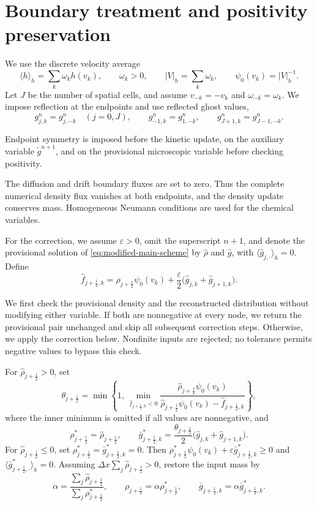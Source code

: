\documentclass[11pt,twoside]{article}
\numberwithin{equation}{section}
\theoremstyle{plain}
\theoremstyle{nonumberplain}
\newenvironment{resultrevision}{\par\begingroup\color{red}}{\par\endgroup}
\begin{document}
\section{Boundary treatment and positivity preservation}
\label{sec:limiter}
We use the discrete velocity average
\[
\langle h\rangle_h=\sum_{k}\omega_k h(v_k),
\qquad \omega_k>0,\qquad
|V|_h=\sum_{k}\omega_k,\qquad
\psi_0(v_k)=|V|_h^{-1}.
\]
Let $J$ be the number of spatial cells, and assume
$v_{-k}=-v_k$ and $\omega_{-k}=\omega_k$.
We impose reflection at the endpoints and use reflected ghost values,
\[
g_{j,k}^n=g_{j,-k}^n\quad(j=0,J),\qquad
g_{-1,k}^n=g_{1,-k}^n,\qquad
g_{J+1,k}^n=g_{J-1,-k}^n.
\]
\begin{resultrevision}
Endpoint symmetry is imposed before the kinetic update, on the auxiliary variable $\widetilde g^{n+1}$, and on the provisional microscopic variable before checking positivity.
\end{resultrevision}
The diffusion and drift boundary fluxes are set to zero.
Thus the complete numerical density flux vanishes at both endpoints,
and the density update conserves mass.
Homogeneous Neumann conditions are used for the chemical variables.

For the correction, we assume $\varepsilon>0$, omit the superscript $n+1$,
and denote the provisional solution of
\eqref{eq:modified-main-scheme} by $\widehat\rho$ and $\widehat g$,
with $\langle\widehat g_{j,\cdot}\rangle_h=0$.
Define
\[
\widehat f_{j+\frac12,k}
=\widehat\rho_{j+\frac12}\psi_0(v_k)
+\frac{\varepsilon}{2}
 \bigl(\widehat g_{j,k}+\widehat g_{j+1,k}\bigr).
\]
\begin{resultrevision}
We first check the provisional density and the reconstructed distribution without modifying either variable. If both are nonnegative at every node, we return the provisional pair unchanged and skip all subsequent correction steps. Otherwise, we apply the correction below. Nonfinite inputs are rejected; no tolerance permits negative values to bypass this check.
\end{resultrevision}

For $\widehat\rho_{j+\frac12}>0$, set
\[
\theta_{j+\frac12}
=\min\left\{1,\,
\min_{\widehat f_{j+\frac12,k}<0}
\frac{\widehat\rho_{j+\frac12}\psi_0(v_k)}
{\widehat\rho_{j+\frac12}\psi_0(v_k)-\widehat f_{j+\frac12,k}}
\right\},
\]
where the inner minimum is omitted if all values are nonnegative, and
\[
\rho_{j+\frac12}^{*}=\widehat\rho_{j+\frac12},
\qquad
\bar g_{j+\frac12,k}^{*}
=\frac{\theta_{j+\frac12}}{2}
 \bigl(\widehat g_{j,k}+\widehat g_{j+1,k}\bigr).
\]
For $\widehat\rho_{j+\frac12}\le0$, set
$\rho_{j+\frac12}^{*}=\bar g_{j+\frac12,k}^{*}=0$.
Then $\rho_{j+\frac12}^{*}\psi_0(v_k)
+\varepsilon\bar g_{j+\frac12,k}^{*}\ge0$ and
$\langle\bar g_{j+\frac12,\cdot}^{*}\rangle_h=0$.
Assuming $\Delta x\sum_j\widehat\rho_{j+\frac12}>0$, restore the
input mass by
\[
\alpha=\frac{\sum_j\widehat\rho_{j+\frac12}}
                 {\sum_j\rho_{j+\frac12}^{*}},
\qquad
\rho_{j+\frac12}=\alpha\rho_{j+\frac12}^{*},
\qquad
\bar g_{j+\frac12,k}=\alpha\bar g_{j+\frac12,k}^{*}.
\]
\end{document}
